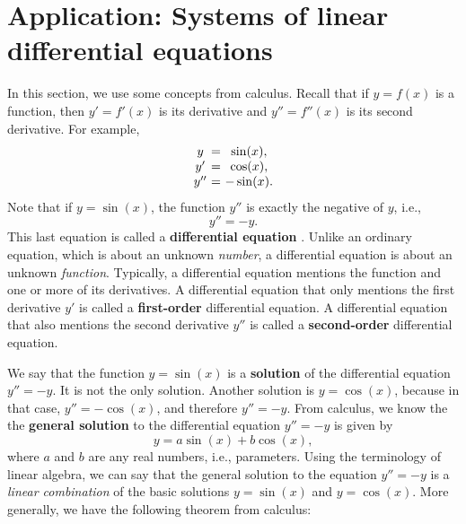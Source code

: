 \section{Application: Systems of linear differential equations}

In this section, we use some concepts from calculus. Recall that if
$y=f(x)$ is a function, then $y' = f'(x)$ is its derivative%
 and $y'' = f''(x)$ is its second derivative.  For
example,
\begin{equation*}
  \begin{array}{c@{~}c@{~}c}
    y &=& \sin(x),\\
    y' &=& \cos(x),\\
    y''&=& -\sin(x).\\
  \end{array}
\end{equation*}
Note that if $y=\sin(x)$, the function $y''$ is exactly the negative
of $y$, i.e.,
\begin{equation}
  y'' = -y.
\end{equation}
This last equation is called a \textbf{differential equation}%
%
. Unlike an ordinary equation, which is
about an unknown {\em number}, a differential equation is about an
unknown {\em function}. Typically, a differential equation mentions
the function and one or more of its derivatives. A differential
equation that only mentions the first derivative $y'$ is called a
\textbf{first-order}%
 differential equation. A
differential equation that also mentions the second derivative $y''$
is called a \textbf{second-order}%
 differential equation.

We say that the function $y=\sin(x)$ is a \textbf{solution}%
 of the differential equation
$y'' = -y$. It is not the only solution. Another solution is
$y=\cos(x)$, because in that case, $y''=-\cos(x)$, and therefore
$y''=-y$. From calculus, we know the the \textbf{general solution} to
the differential equation $y'' = -y$ is given by
\begin{equation*}
  y = a\sin(x) + b\cos(x),
\end{equation*}
where $a$ and $b$ are any real numbers, i.e., parameters. Using the
terminology of linear algebra, we can say that the general solution to
the equation $y'' = -y$ is a {\em linear combination} of the basic
solutions $y=\sin(x)$ and $y=\cos(x)$. More generally, we have the
following theorem from calculus:

